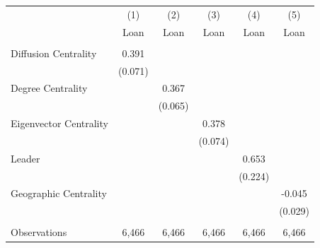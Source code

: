 \begin{tabular}{lccccc} \hline
 & (1) & (2) & (3) & (4) & (5) \\
 & Loan & Loan & Loan & Loan & Loan \\ \hline
 &  &  &  &  &  \\
Diffusion Centrality & 0.391 &  &  &  &  \\
 & (0.071) &  &  &  &  \\
Degree Centrality &  & 0.367 &  &  &  \\
 &  & (0.065) &  &  &  \\
Eigenvector Centrality &  &  & 0.378 &  &  \\
 &  &  & (0.074) &  &  \\
Leader &  &  &  & 0.653 &  \\
 &  &  &  & (0.224) &  \\
Geographic Centrality &  &  &  &  & -0.045 \\
 &  &  &  &  & (0.029) \\
 &  &  &  &  &  \\
 Observations & 6,466 & 6,466 & 6,466 & 6,466 & 6,466 \\ \hline
\end{tabular}
